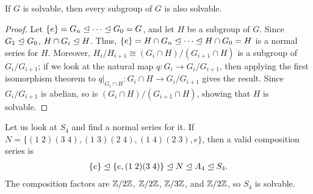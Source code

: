 \begin{lemma}
    If $G$ is solvable, then every subgroup of $G$ is also solvable.
\end{lemma}
\begin{proof}
    Let $\{e\} = G_{n} \trianglelefteq \cdots \trianglelefteq G_{0} = G$, and let $H$ be a subgroup of $G$. Since $G_{1} \trianglelefteq G_{0}$, $H \cap G_{i} \trianglelefteq H$. Thus, $\{e\} = H \cap G_{n} \trianglelefteq \cdots \trianglelefteq H \cap G_{0} = H$ is a normal series for $H$. Moreover, $H_{i}/H_{i+1} \cong (G_{i} \cap H)/(G_{i+1} \cap H)$ is a subgroup of $G_{i}/G_{i+1}$; if we look at the natural map $q:G_{i} \to G_{i}/G_{i+1}$, then applying the first isomorphism theorem to $q|_{G_{i} \cap H}:G_{i} \cap H \to G_{i}/G_{i+1}$ gives the result. Since $G_{i}/G_{i+1}$ is abelian, so is $(G_{i} \cap H)/(G_{i+1} \cap H)$, showing that $H$ is solvable. 
\end{proof}

\begin{example}
    Let us look at $S_{4}$ and find a normal series for it. If $N = \{(1\;2)(3\;4),(1\;3)(2\;4),(1\;4)(2\;3),e\}$, then a valid composition series is
    \begin{align}
        \{e\} \trianglelefteq \{e,(1\;2)(3\;4)\} \trianglelefteq N \trianglelefteq A_{4} \trianglelefteq S_{4}.
    \end{align}
    The composition factors are $\mathbb{Z}/2\mathbb{Z}$, $\mathbb{Z}/2\mathbb{Z}$, $\mathbb{Z}/3\mathbb{Z}$, and $\mathbb{Z}/2\mathbb{Z}$, so $S_{4}$ is solvable.
\end{example}